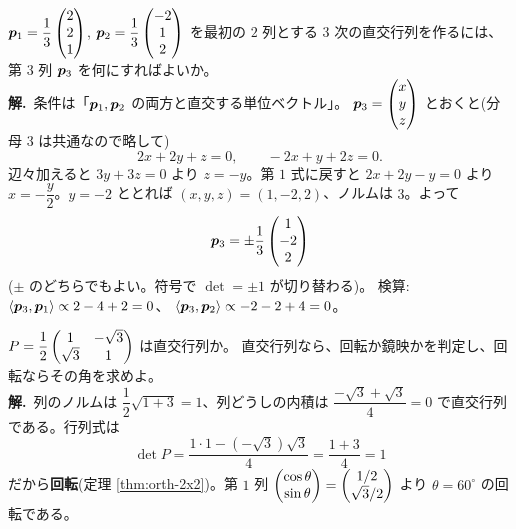 \begin{rei}[例題・基本(第 $3$ 列の補完)]\label{rei:orth-complete}
$\bm{p}_1 = \dfrac{1}{3}\begin{pmatrix}2 \\ 2 \\ 1\end{pmatrix}$,
$\bm{p}_2 = \dfrac{1}{3}\begin{pmatrix}-2 \\ 1 \\ 2\end{pmatrix}$ を最初の $2$ 列とする
$3$ 次の直交行列を作るには、第 $3$ 列 $\bm{p}_3$ を何にすればよいか。\\
\textbf{解.}\ 条件は「$\bm{p}_1, \bm{p}_2$ の両方と直交する単位ベクトル」。
$\bm{p}_3 = \begin{pmatrix}x \\ y \\ z\end{pmatrix}$ とおくと(分母 $3$ は共通なので略して)
\[
2x + 2y + z = 0, \qquad -2x + y + 2z = 0.
\]
辺々加えると $3y + 3z = 0$ より $z = -y$。第 $1$ 式に戻すと
$2x + 2y - y = 0$ より $x = -\dfrac{y}{2}$。$y = -2$ ととれば
$(x, y, z) = (1, -2, 2)$、ノルムは $3$。よって
\[
\bm{p}_3 = \pm\frac{1}{3}\begin{pmatrix}1 \\ -2 \\ 2\end{pmatrix}
\]
($\pm$ のどちらでもよい。符号で $\det = \pm 1$ が切り替わる)。
検算:$\langle \bm{p}_3, \bm{p}_1 \rangle \propto 2 - 4 + 2 = 0$、
$\langle \bm{p}_3, \bm{p}_2 \rangle \propto -2 - 2 + 4 = 0$。
\end{rei}

\begin{rei}[例題・標準(回転の判定)]\label{rei:orth-rotation}
$P = \dfrac{1}{2}\begin{pmatrix}1 & -\sqrt{3} \\ \sqrt{3} & 1\end{pmatrix}$ は直交行列か。
直交行列なら、回転か鏡映かを判定し、回転ならその角を求めよ。\\
\textbf{解.}\ 列のノルムは $\dfrac{1}{2}\sqrt{1 + 3} = 1$、列どうしの内積は
$\dfrac{-\sqrt{3} + \sqrt{3}}{4} = 0$ で直交行列である。行列式は
\[
\det P = \frac{1 \cdot 1 - (-\sqrt{3})\sqrt{3}}{4} = \frac{1 + 3}{4} = 1
\]
だから\textbf{回転}(定理 \ref{thm:orth-2x2})。第 $1$ 列
$\begin{pmatrix}\cos\theta \\ \sin\theta\end{pmatrix} = \begin{pmatrix}1/2 \\ \sqrt{3}/2\end{pmatrix}$ より
$\theta = 60^\circ$ の回転である。
\end{rei}

